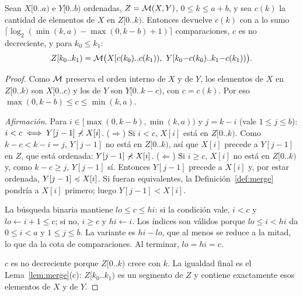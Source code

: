 \begin{lema}[CoRango]\label{lem:corango}
Sean $X[0..a)$ e $Y[0..b)$ ordenadas, $Z=\mathcal{M}(X,Y)$, $0\le k\le a+b$, y sea $c(k)$ la
cantidad de elementos de $X$ en $Z[0..k)$. Entonces  devuelve $c(k)$
con a lo sumo $\lceil\log_2(\min(k,a)-\max(0,k-b)+1)\rceil$ comparaciones, $c$ es no
decreciente, y para $k_0\le k_1$:
\[
Z[k_0..k_1)=\Mrg\big(X[c(k_0)..c(k_1)),\ Y[k_0{-}c(k_0)..k_1{-}c(k_1))\big).
\]
\end{lema}
\begin{proof}
Como $\mathcal{M}$ preserva el orden interno de $X$ y de $Y$, los elementos de $X$ en
$Z[0..k)$ son $X[0..c)$ y los de $Y$ son $Y[0..k{-}c)$, con $c=c(k)$. Por eso
$\max(0,k-b)\le c\le\min(k,a)$.

\emph{Afirmación.} Para $i\in[\max(0,k-b),\min(k,a))$ y $j=k-i$ (vale $1\le j\le b$):
$i<c\iff Y[j-1]\not\prec X[i]$.
($\Rightarrow$) Si $i<c$, $X[i]$ está en $Z[0..k)$. Como $k-c<k-i=j$, $Y[j-1]$ no está
en $Z[0..k)$, así que $X[i]$ precede a $Y[j-1]$ en $Z$, que está ordenada:
$Y[j-1]\not\prec X[i]$.
($\Leftarrow$) Si $i\ge c$, $X[i]$ no está en $Z[0..k)$ y, como $k-c\ge j$, $Y[j-1]$
sí. Entonces $Y[j-1]$ precede a $X[i]$ y, por estar ordenada, $Y[j-1]\preccurlyeq X[i]$. Si
fueran equivalentes, la Definición~\ref{def:merge} pondría a $X[i]$ primero; luego
$Y[j-1]\lt X[i]$.

La búsqueda binaria mantiene $lo\le c\le hi$: si la condición vale, $i<c$ y
$lo\gets i+1\le c$; si no, $i\ge c$ y $hi\gets i$. Los índices son válidos porque
$lo\le i<hi$ da $0\le i<a$ y $1\le j\le b$. La variante es $hi-lo$, que al menos se
reduce a la mitad, lo que da la cota de comparaciones. Al terminar, $lo=hi=c$.

$c$ es no decreciente porque $Z[0..k)$ crece con $k$. La igualdad final es el
Lema~\ref{lem:merge}(c): $Z[k_0..k_1)$ es un segmento de $Z$ y contiene exactamente esos
elementos de $X$ y de $Y$.
\end{proof}

